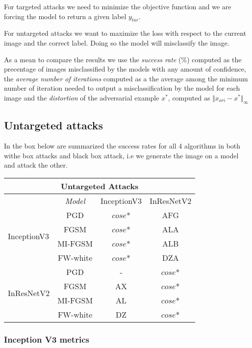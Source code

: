 \documentclass[10pt,twocolumn,letterpaper, english]{article}
\theoremstyle{definition}
\theoremstyle{plain}
\theoremstyle{plain}
\theoremstyle{plain}
\theoremstyle{plain}
\theoremstyle{remark}
\theoremstyle{remark}
\theoremstyle{definition}
\theoremstyle{definition}
\theoremstyle{definition}
\theoremstyle{definition}
\begin{document}
For targeted attacks we need to minimize the objective function and we are forcing the model to return a given label $y_{tar}$.

For untargeted attacks we want to maximize the loss with respect to the current image and the correct label. Doing so the model will misclassify the image.

As a mean to compare the results we use the \textit{success rate} ($\%$) computed as the precentage of images misclassified by the models with any amount of confidence, the \textit{average number of iterations} computed as a the average among the minimum number of iteration needed to output a misclassification by the model for each image and the \textit{distortion} of the adversarial example $x^\ast$, computed as $\Vert x_{ori} - x^\ast \Vert_{\infty}$

\subsection{Untargeted attacks}

In the box below are summarized the success rates for all 4 algorithms in both withe box attacks and black box attack, i.e we generate the image on a model and attack the other.

\begin{tabular}{ |l|c|c|c| }
 \hline
 \multicolumn{4}{|c|}{Untargeted Attacks} \\
 \hline
  & \textit{Model} & InceptionV3 & InResNetV2 \\
 \hline
 
 \multirow{4}{5em}{InceptionV3} & PGD   & $cose$*   &  AFG\\
 & FGSM&   $cose$*  & ALA   \\
 & MI-FGSM & $cose$* & ALB\\
 & FW-white & $cose$* & DZA\\

 \hline
 \multirow{4}{5em}{InResNetV2} & PGD   & -   &  $cose$*\\
 & FGSM&   AX  & $cose$*   \\
 & MI-FGSM &AL & $cose$*\\
 & FW-white &DZ & $cose$*\\
 \hline
\end{tabular}

\subsubsection{Inception V3 metrics}
\end{document}
